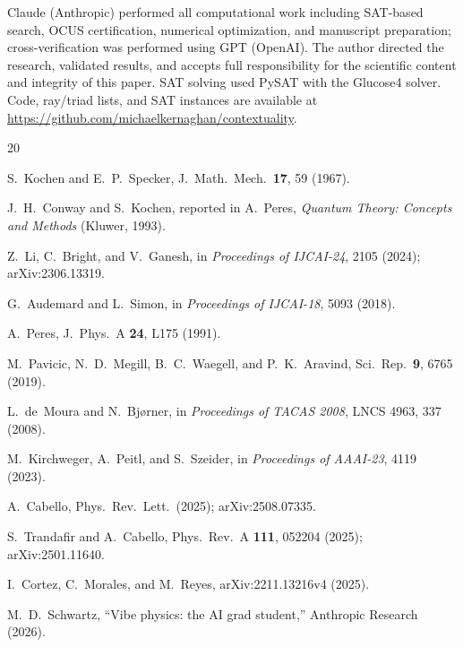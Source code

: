 \documentclass[twocolumn,prl,superscriptaddress,nofootinbib]{revtex4-2}
\begin{document}
\begin{acknowledgments}
Claude (Anthropic) performed all computational work including SAT-based search, OCUS certification, numerical optimization, and manuscript preparation; cross-verification was performed using GPT (OpenAI).  The author directed the research, validated results, and accepts full responsibility for the scientific content and integrity of this paper.  SAT solving used PySAT with the Glucose4 solver.  Code, ray/triad lists, and SAT instances are available at \url{https://github.com/michaelkernaghan/contextuality}.
\end{acknowledgments}

\begin{thebibliography}{20}

S.~Kochen and E.~P.~Specker,
J.\ Math.\ Mech.\ \textbf{17}, 59 (1967).

J.~H.~Conway and S.~Kochen,
reported in A.~Peres, \textit{Quantum Theory: Concepts and Methods} (Kluwer, 1993).

Z.~Li, C.~Bright, and V.~Ganesh,
in \textit{Proceedings of IJCAI-24}, 2105 (2024); arXiv:2306.13319.

G.~Audemard and L.~Simon,
in \textit{Proceedings of IJCAI-18}, 5093 (2018).

A.~Peres,
J.\ Phys.\ A \textbf{24}, L175 (1991).

M.~Pavicic, N.~D.~Megill, B.~C.~Waegell, and P.~K.~Aravind,
Sci.\ Rep.\ \textbf{9}, 6765 (2019).

L.~de~Moura and N.~Bj{\o}rner,
in \textit{Proceedings of TACAS 2008}, LNCS 4963, 337 (2008).

M.~Kirchweger, A.~Peitl, and S.~Szeider,
in \textit{Proceedings of AAAI-23}, 4119 (2023).

A.~Cabello,
Phys.\ Rev.\ Lett.\ (2025); arXiv:2508.07335.

S.~Trandafir and A.~Cabello,
Phys.\ Rev.\ A \textbf{111}, 052204 (2025); arXiv:2501.11640.

I.~Cortez, C.~Morales, and M.~Reyes,
arXiv:2211.13216v4 (2025).

M.~D.~Schwartz,
``Vibe physics: the AI grad student,''
Anthropic Research (2026).

\end{thebibliography}
\end{document}
